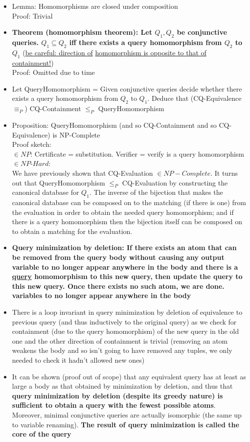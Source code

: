 \documentclass[20pt,a4paper,landscape]{extarticle}
\begin{document}
\begin{flushleft}
\begin{itemize}
\item Lemma: Homomorphisms are closed under composition\\
Proof: Trivial
\item \textbf{Theorem (homomorphism theorem): Let \boldmath$Q_1, Q_2$ be conjunctive queries. $Q_1 \subseteq Q_2$ iff there exists a query homomorphism from $Q_2$ to $Q_1$} (\underline{be careful: direction of} \underline{homomorphism is opposite to that of containment!})\\
Proof: Omitted due to time
\item Let QueryHomomorphism = Given conjunctive queries decide whether there exists a query homomorphism from $Q_2$ to $Q_1$. Deduce that (CQ-Equivalence $\equiv_P$) CQ-Containment $\leq_P$ QueryHomomorphism
\item Proposition: QueryHomomorphism (and so CQ-Containment and so CQ-Equivalence) is NP-Complete\\
Proof sketch:\\
$\in NP$: Certificate = substitution. Verifier = verify is a query homomorphism\\
$\in NP\mbox{-}Hard$:\\We have previously shown that CQ-Evaluation $\in NP{-}Complete$. It turns out that QueryHomomorphism $\leq_P$ CQ-Evaluation by constructing the canonical database for $Q_1$. The inverse of the bijection that makes the canonical database can be composed on to the matching (if there is one) from the evaluation in order to obtain the needed query homomorphism; and if there is a query homomorphism then the bijection itself can be composed on to obtain a matching for the evaluation.
\item \textbf{Query minimization by deletion: If there exists an atom that can be removed from the query body without causing any output variable to no longer appear anywhere in the body and there is a \underline{query} homomorphism to this new query, then update the query to this new query. Once there exists no such atom, we are done. variables to no longer appear anywhere in the body}
\item There is a loop invariant in query minimization by deletion of equivalence to previous query (and thus inductively to the original query) as we check for containment (due to the query homomorphism) of the new query in the old one and the other direction of containment is trivial (removing an atom weakens the body and so isn't going to have removed any tuples, we only needed to check it hadn't allowed new ones)
\item It can be shown (proof out of scope) that any equivalent query has at least as large a body as that obtained by minimization by deletion, and thus that \textbf{query minimization by deletion (despite its greedy nature) is sufficient to obtain a query with the fewest possible atoms}. Moreover, minimal conjunctive queries are actually isomorphic (the same up to variable renaming). \textbf{The result of query minimization is called the core of the query}

\end{itemize}
\end{flushleft}
\end{document}
